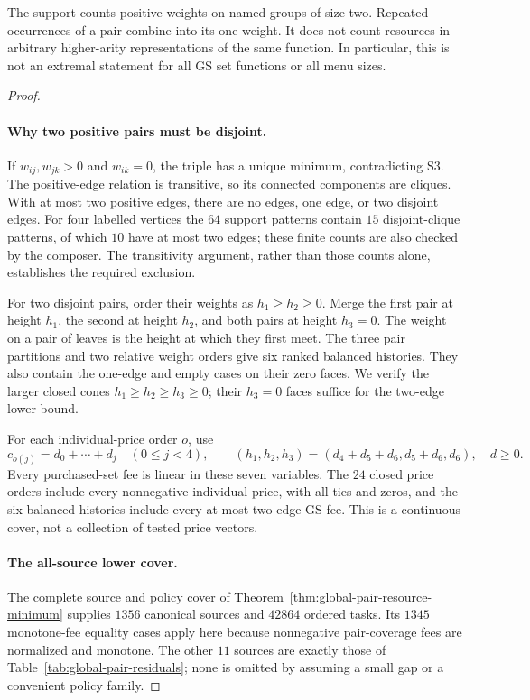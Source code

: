 The support counts positive weights on named groups of size two.
Repeated occurrences of a pair combine into its one weight. It does
not count resources in arbitrary higher-arity representations of
the same function. In particular, this is not an extremal statement
for all GS set functions or all menu sizes.

\begin{proof}
\paragraph*{Why two positive pairs must be disjoint.}
If $w_{ij},w_{jk}>0$ and $w_{ik}=0$, the triple has a unique minimum,
contradicting S3. The positive-edge relation is transitive, so its
connected components are cliques. With at most two positive edges,
there are no edges, one edge, or two disjoint edges. For four labelled
vertices the $64$ support patterns contain $15$ disjoint-clique
patterns, of which $10$ have at most two edges; these finite counts
are also checked by the composer. The transitivity argument, rather
than those counts alone, establishes the required exclusion.

For two disjoint pairs, order their weights as $h_1\geq h_2\geq0$.
Merge the first pair at height $h_1$, the second at height $h_2$,
and both pairs at height $h_3=0$. The weight on a pair of leaves is
the height at which they first meet. The three pair partitions and
two relative weight orders give six ranked balanced histories.
They also contain the one-edge and empty cases on their zero faces.
We verify the larger closed cones $h_1\geq h_2\geq h_3\geq0$;
their $h_3=0$ faces suffice for the two-edge lower bound.

For each individual-price order $o$, use
\[
 c_{o(j)}=d_0+\cdots+d_j\quad(0\leq j<4),\qquad
 (h_1,h_2,h_3)=(d_4+d_5+d_6,d_5+d_6,d_6),
 \quad d\geq0.
\]
Every purchased-set fee is linear in these seven variables. The
$24$ closed price orders include every nonnegative individual
price, with all ties and zeros, and the six balanced histories
include every at-most-two-edge GS fee. This is a continuous cover,
not a collection of tested price vectors.

\paragraph*{The all-source lower cover.}
The complete source and policy cover of
Theorem~\ref{thm:global-pair-resource-minimum} supplies $1356$
canonical sources and $42864$ ordered tasks. Its $1345$ monotone-fee
equality cases apply here because nonnegative pair-coverage fees
are normalized and monotone. The other $11$ sources are exactly
those of Table~\ref{tab:global-pair-residuals}; none is omitted by
assuming a small gap or a convenient policy family.


\end{proof}
